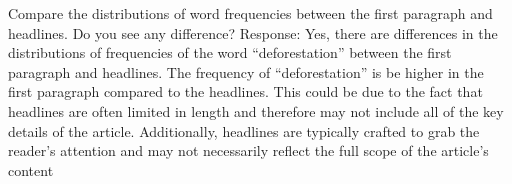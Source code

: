 \documentclass[
  letterpaper,
  DIV=11,
  numbers=noendperiod]{scrartcl}
\begin{document}
Compare the distributions of word frequencies between the first
paragraph and headlines. Do you see any difference? Response: Yes, there
are differences in the distributions of frequencies of the word
``deforestation'' between the first paragraph and headlines. The
frequency of ``deforestation'' is be higher in the first paragraph
compared to the headlines. This could be due to the fact that headlines
are often limited in length and therefore may not include all of the key
details of the article. Additionally, headlines are typically crafted to
grab the reader's attention and may not necessarily reflect the full
scope of the article's content
\end{document}
